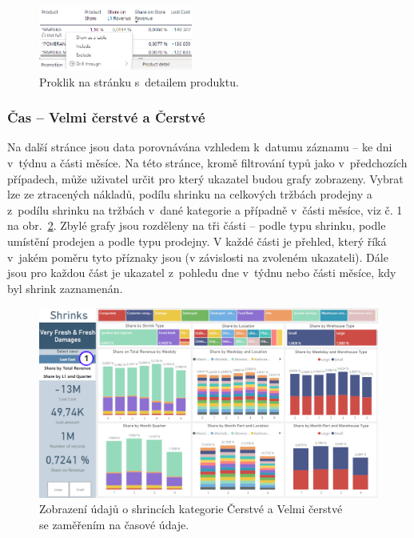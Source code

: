 \begin{figure}[h!]
    \centering
    \captionsetup{justification=centering}
    \includegraphics[width=0.45\textwidth]{obrazky/PBI/detaildrill.png}
    \caption{Proklik na stránku s~detailem produktu.}
    \label{obr:PBI:drilldetail}
\end{figure}

\subsubsection*{Čas -- Velmi čerstvé a Čerstvé}

Na další stránce jsou data porovnávána vzhledem k~datumu záznamu -- ke dni v~týdnu a části měsíce. Na této stránce, kromě filtrování typů jako v~předchozích případech, může uživatel určit pro který ukazatel budou grafy zobrazeny. Vybrat lze ze ztracených nákladů, podílu shrinku na celkových tržbách prodejny a z~podílu shrinku na tržbách v~dané kategorie a případně v~části měsíce, viz č. 1 na obr.~\ref*{obr:PBI:timeSFF}. Zbylé grafy jsou rozděleny na tři části -- podle typu shrinku, podle umístění prodejen a podle typu prodejny. V každé části je přehled, který říká v~jakém poměru tyto příznaky jsou (v závislosti na zvoleném ukazateli). Dále jsou pro každou část je ukazatel z~pohledu dne v~týdnu nebo části měsíce, kdy byl shrink zaznamenán. 

\begin{figure}[h!]
    \centering
    \captionsetup{justification=centering}
    \includegraphics[width=\textwidth]{obrazky/PBI/timeSFF.png}
    \caption{Zobrazení údajů o shrincích kategorie Čerstvé a Velmi čerstvé \\ se zaměřením na časové údaje.}
    \label{obr:PBI:timeSFF}
\end{figure}

